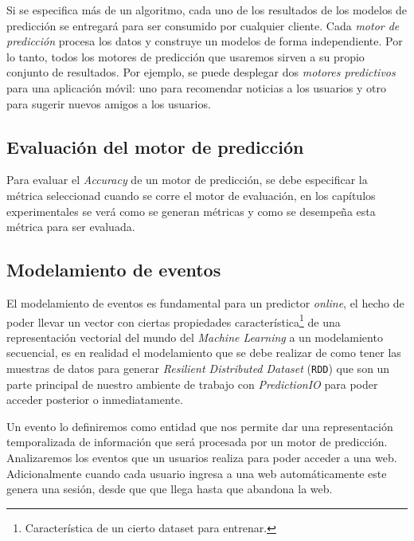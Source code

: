   Si se especifica más de un algoritmo, cada uno de los resultados de los modelos de predicción se entregará para ser consumido por cualquier cliente.
  Cada \emph{motor de predicción} procesa los datos y construye un modelos de forma independiente. Por lo tanto, todos los motores de predicción que usaremos sirven a su propio conjunto de resultados. Por ejemplo, se puede desplegar dos \emph{motores predictivos} para una aplicación móvil: uno para recomendar noticias a los usuarios y otro para sugerir nuevos amigos a los usuarios.


\vspace{1cm}
\subsection{Evaluación del motor de predicción }

  Para evaluar el \emph{Accuracy} de un motor de predicción, se debe especificar la métrica seleccionad cuando se corre el motor de evaluación, en los capítulos experimentales se verá como se generan métricas y como se desempeña esta métrica para ser evaluada.











\subsection{Modelamiento de eventos}





  El modelamiento de eventos es fundamental para un predictor \emph{online}, el hecho de poder llevar un vector con ciertas propiedades característica\footnote{Característica de un cierto dataset para entrenar.} de una representación vectorial del mundo del \emph{Machine Learning} a un modelamiento secuencial, es en realidad el modelamiento que se debe realizar de como  tener las muestras de datos para generar \emph{Resilient Distributed Dataset} (\texttt{RDD}) que son un parte principal de nuestro ambiente de trabajo con \emph{PredictionIO} para poder acceder posterior o inmediatamente. 

  Un evento lo definiremos como entidad que nos permite dar una representación temporalizada de información que será procesada por un motor de predicción. Analizaremos los eventos que un usuarios realiza para poder acceder a una web. Adicionalmente cuando cada usuario ingresa a una web automáticamente este genera una sesión, desde que que llega hasta que abandona la web.

